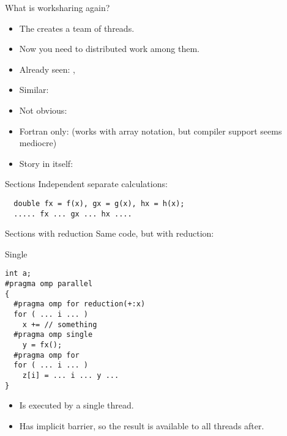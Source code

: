 
\begin{numberedframe}{What is worksharing again?}
  \begin{itemize}
  \item The  creates a team of threads.
  \item Now you need to distributed work among them.
  \item Already seen: , 
  \item Similar: 
  \item Not obvious: 
  \item Fortran only:  (works with array notation, but
    compiler support seems mediocre)
  \item Story in itself: 
  \end{itemize}
\end{numberedframe}

\begin{numberedframe}{Sections}
Independent separate calculations:
\begin{lstlisting}
  double fx = f(x), gx = g(x), hx = h(x);
  ..... fx ... gx ... hx ....
\end{lstlisting}
\end{numberedframe}

\begin{numberedframe}{Sections with reduction}
Same code, but with reduction:
\end{numberedframe}

\begin{numberedframe}{Single}
\begin{lstlisting}
int a;
#pragma omp parallel
{
  #pragma omp for reduction(+:x)
  for ( ... i ... )
    x += // something
  #pragma omp single
    y = fx();
  #pragma omp for
  for ( ... i ... )
    z[i] = ... i ... y ...
}
\end{lstlisting}
  \begin{itemize}
  \item Is executed by a single thread.
  \item Has implicit barrier, so the result is available to all threads
    after.
  \end{itemize}
\end{numberedframe}

